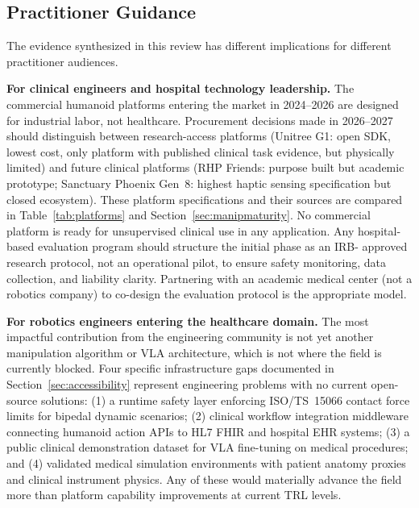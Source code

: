 \subsection{Practitioner Guidance}
\label{sec:practitioners}

The evidence synthesized in this review has different implications for different
practitioner audiences.

\textbf{For clinical engineers and hospital technology leadership.} The commercial
humanoid platforms entering the market in 2024--2026 are designed for industrial
labor, not healthcare. Procurement decisions made in 2026--2027 should distinguish
between research-access platforms (Unitree G1: open SDK, lowest cost, only
platform with published clinical task evidence, but physically limited) and future
clinical platforms (RHP Friends: purpose built but academic prototype; Sanctuary
Phoenix Gen~8: highest haptic sensing specification but closed ecosystem). These
platform specifications and their sources are compared in
Table~\ref{tab:platforms} and Section~\ref{sec:manipmaturity}. No
commercial platform is ready for unsupervised clinical use in any application.
Any hospital-based evaluation program should structure the initial phase as an IRB-
approved research protocol, not an operational pilot, to ensure safety monitoring,
data collection, and liability clarity. Partnering with an academic medical center
(not a robotics company) to co-design the evaluation protocol is the appropriate
model.

\textbf{For robotics engineers entering the healthcare domain.} The most impactful
contribution from the engineering community is not yet another manipulation
algorithm or VLA architecture, which is not where the field is currently
blocked. Four specific
infrastructure gaps documented in Section~\ref{sec:accessibility} represent
engineering problems with no current open-source solutions: (1) a runtime safety
layer enforcing ISO/TS~15066 contact force limits for bipedal dynamic scenarios;
(2) clinical workflow integration middleware connecting humanoid action APIs to
HL7 FHIR and hospital EHR systems; (3) a public clinical demonstration dataset
for VLA fine-tuning on medical procedures; and (4) validated medical simulation
environments with patient anatomy proxies and clinical instrument physics. Any
of these would materially advance the field more than platform capability
improvements at current TRL levels.

